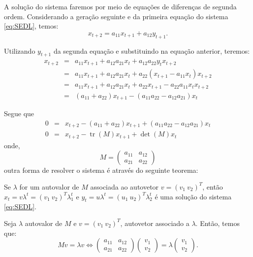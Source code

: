 A solução do sistema faremos por meio de equações de diferenças de segunda ordem. Considerando a geração seguinte e da primeira equação do sistema \eqref{eq:SEDL}, temos: 
$$x_{t+2} = a_{11}x_{t+1} + a_{12}y_{t+1}.$$

Utilizando $y_{t+1}$ da segunda equação e substituindo na equação anterior, teremos: 
$$\begin{array}{rcl}
x_{t+2}
&=& a_{11}x_{t+1} + a_{12}a_{21}x_{t} + a_{12}a_{22}y_{t} x_{t+2} \\
&=& a_{11}x_{t+1} + a_{12}a_{21}x_{t} + a_{22}(x_{t+1} - a_{11}x_{t}) x_{t+2} \\
&=& a_{11}x_{t+1} + a_{12}a_{21}x_{t} + a_{22}x_{t+1} - a_{22}a_{11}x_{t} x_{t+2} \\
&=& (a_{11} + a_{22})x_{t+1} - (a_{11}a_{22} - a_{12}a_{21})x_{t} 
\end{array}$$

Segue que
$$\begin{array}{rcl}
0 &=& x_{t+2} - (a_{11} + a_{22})x_{t+1} + (a_{11}a_{22} - a_{12}a_{21})x_{t} \\
0 &=& x_{t+2} - \operatorname{tr}(M)x_{t+1} + \det(M) x_{t}
\end{array}$$
onde,
$$M = \left(\begin{array}{cc} a_{11} & a_{12} \\ a_{21} & a_{22} \end{array}\right)$$
outra forma de resolver o sistema é através do seguinte teorema:

\begin{theorem}
Se $\lambda$ for um autovalor de $M$ associada ao autovetor $v = (v_1\ v_2)^T$, então $x_{t} = v \lambda^{t} = (v_1 \ v_2)^T \lambda_{1}^{t}$ e $y_{t} = u \lambda^{t} = (u_1 \ u_2)^T \lambda_{2}^{t}$ é uma solução do sistema \eqref{eq:SEDL}.
\end{theorem}

Seja $\lambda$ autovalor de $M$ e $v = (v_1\ v_2)^T$, autovetor associado a $\lambda$. Então, temos que: 
$$M v = \lambda v \Leftrightarrow \left(\begin{array}{cc} a_{11} & a_{12} \\ a_{21} & a_{22} \end{array}\right) \left(\begin{array}{c} v_1 \\ v_2 \end{array}\right) = \lambda \left(\begin{array}{c} v_1 \\ v_2 \end{array}\right).$$

